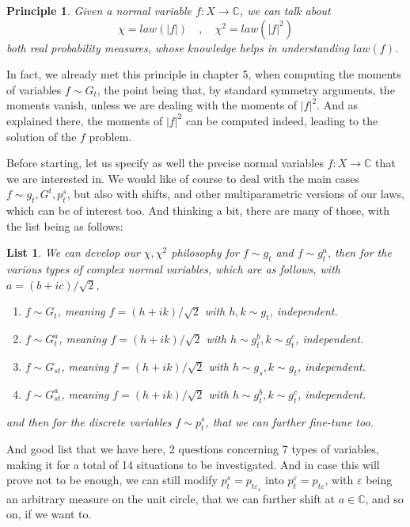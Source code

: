 \documentclass[12pt]{amsbook}
\newtheorem{liste}[theorem]{List}
\newtheorem{principle}[theorem]{Principle}
\begin{document}

\begin{principle}
Given a normal variable $f:X\to\mathbb C$, we can talk about
$$\chi=law{(|f|)}\quad,\quad\chi^2=law(|f|^2)$$
both real probability measures, whose knowledge helps in understanding $law(f)$.
\end{principle}

In fact, we already met this principle in chapter 5, when computing the moments of variables $f\sim G_t$, the point being that, by standard symmetry arguments, the moments vanish, unless we are dealing with the moments of $|f|^2$. And as explained there, the moments of $|f|^2$ can be computed indeed, leading to the solution of the $f$ problem.

\bigskip

Before starting, let us specify as well the precise normal variables $f:X\to\mathbb C$ that we are interested in. We would like of course to deal with the main cases $f\sim g_t,G^t,p^s_t$, but also with shifts, and other multiparametric versions of our laws, which can be of interest too. And thinking a bit, there are many of those, with the list being as follows:

\begin{liste}
We can develop our $\chi,\chi^2$ philosophy for $f\sim g_t$ and $f\sim g_t^a$, then for the various types of complex normal variables, which are as follows, with $a=(b+ic)/\sqrt{2}$,
\begin{enumerate}
\item $f\sim G_t$, meaning $f=(h+ik)/\sqrt{2}$ with $h,k\sim g_t$, independent.

\item $f\sim G_t^a$, meaning $f=(h+ik)/\sqrt{2}$ with $h\sim g_t^b,k\sim g_t^c$, independent. 

\item $f\sim G_{st}$, meaning $f=(h+ik)/\sqrt{2}$ with $h\sim g_s,k\sim g_t$, independent.

\item $f\sim G_{st}^a$, meaning $f=(h+ik)/\sqrt{2}$ with $h\sim g_t^b,k\sim g_t^c$, independent. 
\end{enumerate}
and then for the discrete variables $f\sim p^s_t$, that we can further fine-tune too.
\end{liste}

And good list that we have here, 2 questions concerning 7 types of variables, making it for a total of 14 situations to be investigated. And in case this will prove not to be enough, we can still modify $p^s_t=p_{t\varepsilon_s}$ into $p^\varepsilon_t=p_{t\varepsilon}$, with $\varepsilon$ being an arbitrary measure on the unit circle, that we can further shift at $a\in\mathbb C$, and so on, if we want to. 
\end{document}
